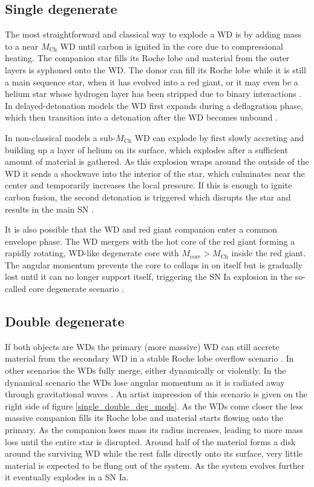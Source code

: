\documentclass[a4paper,oneside,12pt, class=Latex/Classes/PhDthesisPSnPDF, crop=false]{standalone}
\begin{document}
\subsection{Single degenerate}
The most straightforward and classical way to explode a WD is by adding mass to a near $M_\text{Ch}$ WD until carbon is ignited in the core due to compressional heating. The companion star fills its Roche lobe and material from the outer layers is syphoned onto the WD. The donor can fill its Roche lobe while it is still a main sequence star, when it has evolved into a red giant, or it may even be a helium star whose hydrogen layer has been stripped due to binary interactions \citep{Whelan_classical_Ia_mod, Nomoto_single_degenerate}. In delayed-detonation models the WD first expands during a deflagration phase, which then transition into a detonation after the WD becomes unbound \citep{Kholov_Del_det, Mazzali_common_mechanism}.

In non-classical models a sub-$M_\text{Ch}$ WD can explode by first slowly accreting and building up a layer of helium on its surface, which explodes after a sufficient amount of material is gathered. As this explosion wraps around the outside of the WD it sends a shockwave into the interior of the star, which culminates near the center and temporarily increases the local pressure. If this is enough to ignite carbon fusion, the second detonation is triggered which disrupts the star and results in the main SN \citep{Taam_ddet, Livne_ddet, Shen_ddet, Fink_ddet}.

It is also possible that the WD and red giant companion enter a common envelope phase. The WD mergers with the hot core of the red giant forming a rapidly rotating, WD-like degenerate core with $M_\text{core}>M_\text{Ch}$ inside the red giant. The angular momentum prevents the core to collaps in on itself but is gradually lost until it can no longer support itself, triggering the SN Ia explosion in the so-called core degenerate scenario \citep{Kashi_core_deg}.


\subsection{Double degenerate}
If both objects are WDs the primary (more massive) WD can still accrete material from the secondary WD in a stable Roche lobe overflow scenario \citep{CO_accretion_I, CO_accretion_II}. In other scenarios the WDs fully merge, either dynamically or violently. In the dynamical scenario the WDs lose angular momentum as it is radiated away through gravitational waves \citep{Iben_Double_degenerate, Webbink_Double_degenerate}. An artist impression of this scenario is given on the right side of figure \ref{single_double_deg_mods}. As the WDs come closer the less massive companion fills its Roche lobe and material starts flowing onto the primary. As the companion loses mass its radius increases, leading to more mass loss until the entire star is disrupted. Around half of the material forms a disk around the surviving WD while the rest falls directly onto its surface, very little material is expected to be flung out of the system. As the system evolves further it eventually explodes in a SN Ia.
\end{document}
